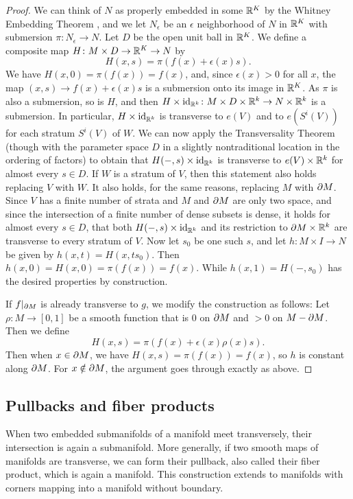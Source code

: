 \begin{proof}
	We can think of $N$ as properly embedded in some $\mathbb{R}^K$ by the Whitney Embedding Theorem \cite[Section 1.8]{GuPo74}, and we let $N_\epsilon$ be an $\epsilon$ neighborhood of $N$ in $\mathbb{R}^K$ with submersion $\pi \colon N_\epsilon \to N$.
	Let $D$ be the open unit ball in $\mathbb{R}^K$.
	We define a composite map $H \colon M \times D \to \mathbb{R}^K \to N$ by
	$$H(x,s) = \pi(f(x)+ \epsilon(x)s).$$
	We have $H(x,0) = \pi(f(x)) = f(x)$, and, since $\epsilon(x)>0$ for all $x$, the map $(x,s) \to f(x)+ \epsilon(x)s$ is a submersion onto its image in $\mathbb{R}^K$.
	As $\pi$ is also a submersion, so is $H$, and then $H \times \mathrm{id}_{\mathbb{R}^k} \colon M \times D \times \mathbb{R}^k \to N \times \mathbb{R}^k$ is a submersion.
	In particular, $H \times \mathrm{id}_{\mathbb{R}^k}$ is transverse to $e(V)$ and to $e(S^i(V))$ for each stratum $S^i(V)$ of $W$.
	We can now apply the Transversality Theorem (though with the parameter space $D$ in a slightly nontraditional location in the ordering of factors) to obtain that $H(-,s) \times \mathrm{id}_{\mathbb{R}^k}$ is transverse to $e(V) \times \mathbb{R}^k$ for almost every $s \in D$.
	If $W$ is a stratum of $V$, then this statement also holds replacing $V$ with $W$.
	It also holds, for the same reasons, replacing $M$ with $\partial M$.
	Since $V$ has a finite number of strata and $M$ and $\partial M$ are only two space, and since the intersection of a finite number of dense subsets is dense, it holds for almost every $s \in D$, that both $H(-,s) \times \mathrm{id}_{\mathbb{R}^k}$ and its restriction to $\partial M \times \mathbb{R}^k$ are transverse to every stratum of $V$.
	Now let $s_0$ be one such $s$, and let $h \colon M \times I \to N$ be given by $h(x,t) = H(x,ts_0)$.
	Then $h(x,0) = H(x,0) = \pi(f(x)) = f(x)$.
	While $h(x,1) = H(-,s_0)$ has the desired properties by construction.

	If $f|_{\partial M}$ is already transverse to $g$, we modify the construction as follows: Let $\rho \colon M \to [0,1]$ be a smooth function that is $0$ on $\partial M$ and $>0$ on $M-\partial M$.
	Then we define
	$$H(x,s) = \pi(f(x)+ \epsilon(x)\rho(x)s).$$
	Then when $x \in \partial M$, we have $H(x,s) = \pi(f(x)) = f(x)$, so $h$ is constant along $\partial M$.
	For $x\notin \partial M$, the argument goes through exactly as above.
\end{proof}

\subsection{Pullbacks and fiber products}

When two embedded submanifolds of a manifold meet transversely, their intersection is again a submanifold.
More generally, if two smooth maps of manifolds are transverse, we can form their pullback, also called their fiber product, which is again a manifold.
This construction extends to manifolds with corners mapping into a manifold without boundary.

